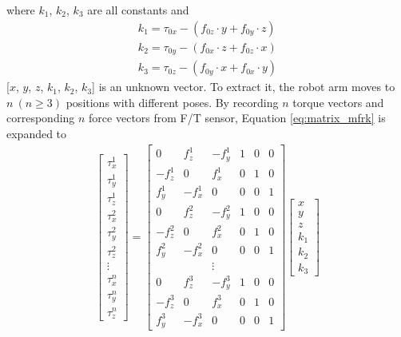where $k_1$, $k_2$, $k_3$ are all constants and
\begin{equation}\label{eq:k1k2k3}
\begin{split}
k_1 = \tau _{0x} - \left( f_{0z} \cdot y + f_{0y} \cdot z \right)  \\
k_2 = \tau _{0y} - \left( f_{0x} \cdot z + f_{0z} \cdot x \right)  \\
k_3 = \tau _{0z} - \left( f_{0y} \cdot x + f_{0x} \cdot y \right)  
\end{split}
\end{equation}
[$x$, $y$, $z$, $k_1$, $k_2$, $k_3$] is an unknown vector. To extract it, the robot arm moves to $n\ (n\geq3)$ positions with different poses. By recording $n$ torque vectors and corresponding $n$ force vectors from F/T sensor, Equation \ref{eq:matrix_mfrk} is expanded to 
\begin{equation}
\begin{split}
\begin{bmatrix}
\tau _x^1	\\
\tau _y^1	\\
\tau _z^1	\\
\tau _x^2	\\
\tau _y^2	\\
\tau _z^2	\\
\vdots\\
\tau _x^n	\\
\tau _y^n	\\
\tau _z^n	
\end{bmatrix}
=
\begin{bmatrix}
0			&f_z^1		&-f_y^1		&1	&0	&0\\
-f_z^1		&0			&f_x^1		&0	&1	&0\\
f_y^1		&-f_x^1		&0			&0	&0	&1\\
0			&f_z^2		&-f_y^2		&1	&0	&0\\
-f_z^2		&0			&f_x^2		&0	&1	&0\\
f_y^2		&-f_x^2		&0			&0	&0	&1\\
 			& 			&\vdots		& 	& 	& \\
0			&f_z^3		&-f_y^3		&1	&0	&0\\
-f_z^3		&0			&f_x^3		&0	&1	&0\\
f_y^3		&-f_x^3		&0			&0	&0	&1
\end{bmatrix}
\begin{bmatrix}
x\\
y\\
z\\
k_1\\
k_2\\
k_3
\end{bmatrix}\\
\end{split}
\end{equation}
